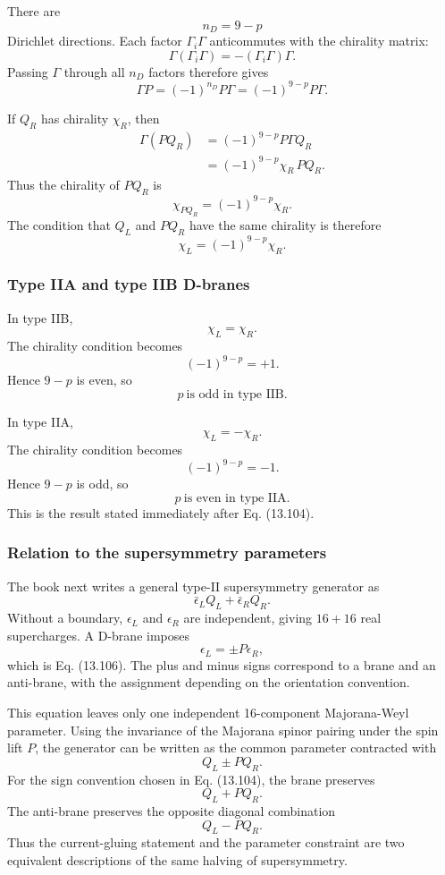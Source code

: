 \documentclass[
  10pt,
  a4paper,
  openany]{book}
\begin{document}
There are \[
n_D=9-p
\] Dirichlet directions. Each factor \(\Gamma_i\Gamma\) anticommutes
with the chirality matrix: \[
\Gamma(\Gamma_i\Gamma)
=-(\Gamma_i\Gamma)\Gamma.
\] Passing \(\Gamma\) through all \(n_D\) factors therefore gives \[
\boxed{
\Gamma P
=(-1)^{n_D}P\Gamma
=(-1)^{9-p}P\Gamma.
}
\]

If \(Q_R\) has chirality \(\chi_R\), then \[
\begin{aligned}
\Gamma(P Q_R)
&=
(-1)^{9-p}P\Gamma Q_R\\%
&=
(-1)^{9-p}\chi_R\,P Q_R.
\end{aligned}
\] Thus the chirality of \(P Q_R\) is \[
\chi_{P Q_R}
=(-1)^{9-p}\chi_R.
\] The condition that \(Q_L\) and \(P Q_R\) have the same chirality is
therefore \[
\boxed{
\chi_L
=(-1)^{9-p}\chi_R.
}
\]

\subsubsection{Type IIA and type IIB
D-branes}\label{type-iia-and-type-iib-d-branes}

In type IIB, \[
\chi_L=\chi_R.
\] The chirality condition becomes \[
(-1)^{9-p}=+1.
\] Hence \(9-p\) is even, so \[
\boxed{
p\ \text{is odd in type IIB}.
}
\]

In type IIA, \[
\chi_L=-\chi_R.
\] The chirality condition becomes \[
(-1)^{9-p}=-1.
\] Hence \(9-p\) is odd, so \[
\boxed{
p\ \text{is even in type IIA}.
}
\] This is the result stated immediately after Eq. (13.104).

\subsubsection{Relation to the supersymmetry
parameters}\label{relation-to-the-supersymmetry-parameters}

The book next writes a general type-II supersymmetry generator as \[
\bar\epsilon_L Q_L+\bar\epsilon_R Q_R.
\] Without a boundary, \(\epsilon_L\) and \(\epsilon_R\) are
independent, giving \(16+16\) real supercharges. A D-brane imposes \[
\boxed{
\epsilon_L
=\pm P\epsilon_R,
}
\] which is Eq. (13.106). The plus and minus signs correspond to a brane
and an anti-brane, with the assignment depending on the orientation
convention.

This equation leaves only one independent 16-component Majorana-Weyl
parameter. Using the invariance of the Majorana spinor pairing under the
spin lift \(P\), the generator can be written as the common parameter
contracted with \[
Q_L\pm P Q_R.
\] For the sign convention chosen in Eq. (13.104), the brane preserves
\[
Q_L+P Q_R.
\] The anti-brane preserves the opposite diagonal combination \[
Q_L-P Q_R.
\] Thus the current-gluing statement and the parameter constraint are
two equivalent descriptions of the same halving of supersymmetry.
\end{document}
